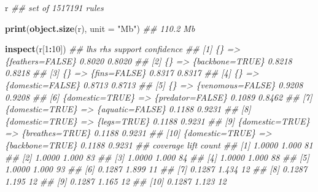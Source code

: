 \documentclass[
  notitlepage]{book}
\newenvironment{Shaded}{\begin{snugshade}}{\end{snugshade}}
\newcommand{\CommentTok}[1]{\textcolor[rgb]{0.56,0.35,0.01}{\textit{#1}}}
\newcommand{\DataTypeTok}[1]{\textcolor[rgb]{0.13,0.29,0.53}{#1}}
\newcommand{\DecValTok}[1]{\textcolor[rgb]{0.00,0.00,0.81}{#1}}
\newcommand{\KeywordTok}[1]{\textcolor[rgb]{0.13,0.29,0.53}{\textbf{#1}}}
\newcommand{\NormalTok}[1]{#1}
\newcommand{\OperatorTok}[1]{\textcolor[rgb]{0.81,0.36,0.00}{\textbf{#1}}}
\newcommand{\StringTok}[1]{\textcolor[rgb]{0.31,0.60,0.02}{#1}}
\begin{document}
\begin{Shaded}
\begin{Highlighting}[]
\NormalTok{r}
\CommentTok{\#\# set of 1517191 rules}
\end{Highlighting}
\end{Shaded}

\begin{Shaded}
\begin{Highlighting}[]
\KeywordTok{print}\NormalTok{(}\KeywordTok{object.size}\NormalTok{(r), }\DataTypeTok{unit =} \StringTok{"Mb"}\NormalTok{)}
\CommentTok{\#\# 110.2 Mb}
\end{Highlighting}
\end{Shaded}

\begin{Shaded}
\begin{Highlighting}[]
\KeywordTok{inspect}\NormalTok{(r[}\DecValTok{1}\OperatorTok{:}\DecValTok{10}\NormalTok{])}
\CommentTok{\#\#      lhs                rhs              support confidence}
\CommentTok{\#\# [1]  \{\}              =\textgreater{} \{feathers=FALSE\} 0.8020  0.8020    }
\CommentTok{\#\# [2]  \{\}              =\textgreater{} \{backbone=TRUE\}  0.8218  0.8218    }
\CommentTok{\#\# [3]  \{\}              =\textgreater{} \{fins=FALSE\}     0.8317  0.8317    }
\CommentTok{\#\# [4]  \{\}              =\textgreater{} \{domestic=FALSE\} 0.8713  0.8713    }
\CommentTok{\#\# [5]  \{\}              =\textgreater{} \{venomous=FALSE\} 0.9208  0.9208    }
\CommentTok{\#\# [6]  \{domestic=TRUE\} =\textgreater{} \{predator=FALSE\} 0.1089  0.8462    }
\CommentTok{\#\# [7]  \{domestic=TRUE\} =\textgreater{} \{aquatic=FALSE\}  0.1188  0.9231    }
\CommentTok{\#\# [8]  \{domestic=TRUE\} =\textgreater{} \{legs=TRUE\}      0.1188  0.9231    }
\CommentTok{\#\# [9]  \{domestic=TRUE\} =\textgreater{} \{breathes=TRUE\}  0.1188  0.9231    }
\CommentTok{\#\# [10] \{domestic=TRUE\} =\textgreater{} \{backbone=TRUE\}  0.1188  0.9231    }
\CommentTok{\#\#      coverage lift  count}
\CommentTok{\#\# [1]  1.0000   1.000 81   }
\CommentTok{\#\# [2]  1.0000   1.000 83   }
\CommentTok{\#\# [3]  1.0000   1.000 84   }
\CommentTok{\#\# [4]  1.0000   1.000 88   }
\CommentTok{\#\# [5]  1.0000   1.000 93   }
\CommentTok{\#\# [6]  0.1287   1.899 11   }
\CommentTok{\#\# [7]  0.1287   1.434 12   }
\CommentTok{\#\# [8]  0.1287   1.195 12   }
\CommentTok{\#\# [9]  0.1287   1.165 12   }
\CommentTok{\#\# [10] 0.1287   1.123 12}
\end{Highlighting}
\end{Shaded}
\end{document}
